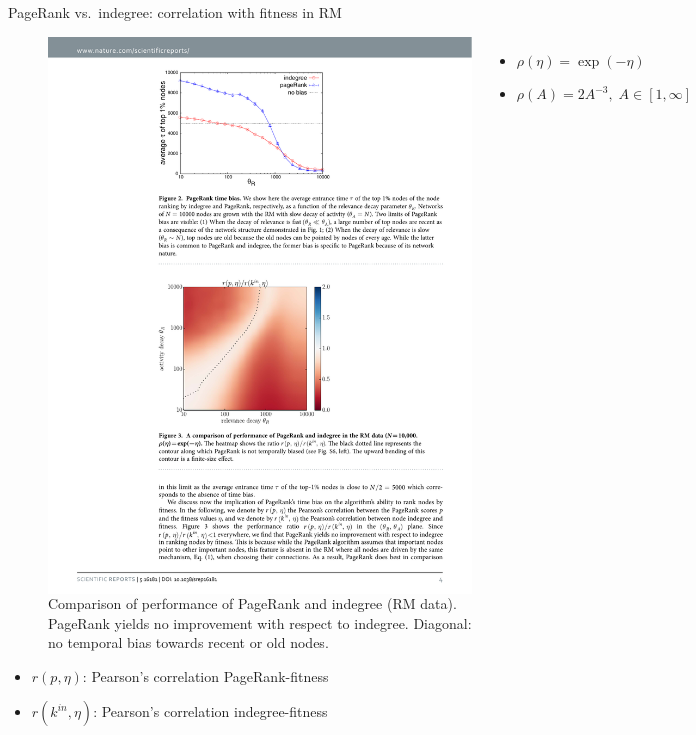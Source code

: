 \documentclass[utf8]{beamer}
\begin{document}
\begin{frame}{PageRank vs.\ indegree: correlation with fitness in RM}
    \begin{figure}
        \begin{columns}

            \includegraphics[width=1.0\textwidth]{figures/PageRankRM_heatmap}

            \caption{Comparison of performance of PageRank and indegree (RM data). \newline
            PageRank yields no improvement with respect to indegree. \newline
            Diagonal: no temporal bias towards recent or old nodes.}
            \begin{footnotesize}
            \begin{itemize}
                \item $\rho(\eta) = \exp(-\eta)$
                \item $\rho(A) = 2A^{-3}, \; A \in [1, \infty]$
            \end{itemize}
        \end{footnotesize}
        \end{columns}
    \end{figure}
    \begin{itemize}
        \item $r(p, \eta)$: Pearson's correlation PageRank-fitness
        \item $r(k^{in}, \eta)$: Pearson's correlation indegree-fitness
    \end{itemize}
\end{frame}
\end{document}
